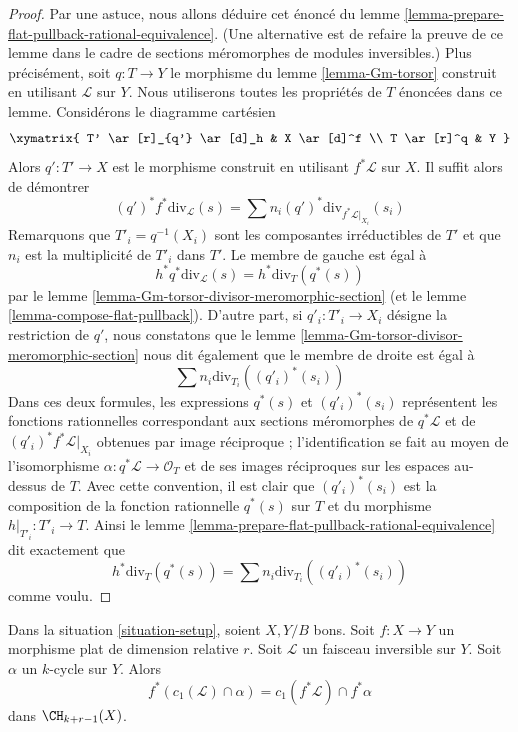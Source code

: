 \begin{proof}
Par une astuce, nous allons déduire cet énoncé du lemme
\ref{lemma-prepare-flat-pullback-rational-equivalence}. (Une alternative est
de refaire la preuve de ce lemme dans le cadre de sections méromorphes de
modules inversibles.) Plus précisément, soit $q : T \to Y$ le morphisme du lemme
\ref{lemma-Gm-torsor} construit en utilisant $\mathcal{L}$ sur $Y$. Nous
utiliserons toutes les propriétés de $T$ énoncées dans ce lemme. Considérons le
diagramme cartésien
$$
\xymatrix{
T' \ar[r]_{q'} \ar[d]_h & X \ar[d]^f \\
T \ar[r]^q & Y
}
$$
Alors $q' : T' \to X$ est le morphisme construit en utilisant $f^*\mathcal{L}$
sur $X$. Il suffit alors de démontrer
$$
(q')^*f^*\text{div}_\mathcal{L}(s) =
\sum n_i (q')^*\text{div}_{f^*\mathcal{L}|_{X_i}}(s_i)
$$
Remarquons que $T'_i = q^{-1}(X_i)$ sont les composantes irréductibles de $T'$
et que $n_i$ est la multiplicité de $T'_i$ dans $T'$. Le membre de gauche est
égal à
$$
h^*q^*\text{div}_\mathcal{L}(s) = h^*\text{div}_T(q^*(s))
$$
par le lemme \ref{lemma-Gm-torsor-divisor-meromorphic-section} (et le lemme
\ref{lemma-compose-flat-pullback}). D'autre part, si $q'_i : T'_i \to
X_i$ désigne la restriction de $q'$, nous constatons que le lemme
\ref{lemma-Gm-torsor-divisor-meromorphic-section} nous dit également que le
membre de droite est égal à
$$
\sum n_i \text{div}_{T_i}((q'_i)^*(s_i))
$$
Dans ces deux formules, les expressions $q^*(s)$ et $(q'_i)^*(s_i)$
représentent les fonctions rationnelles correspondant aux sections méromorphes
de $q^*\mathcal{L}$ et de $(q'_i)^*f^*\mathcal{L}|_{X_i}$ obtenues par image
réciproque ; l'identification se fait au moyen de l'isomorphisme
$\alpha : q^*\mathcal{L} \to \mathcal{O}_T$ et de ses images réciproques sur les
espaces au-dessus de $T$. Avec cette convention, il est clair que
$(q'_i)^*(s_i)$ est la composition de la fonction rationnelle $q^*(s)$ sur $T$
et du morphisme $h|_{T'_i} : T'_i \to T$. Ainsi le lemme
\ref{lemma-prepare-flat-pullback-rational-equivalence} dit exactement que
$$
h^*\text{div}_T(q^*(s)) = \sum n_i \text{div}_{T_i}((q'_i)^*(s_i))
$$
comme voulu.
\end{proof}

\begin{lemma}
\label{lemma-flat-pullback-cap-c1}
Dans la situation \ref{situation-setup}, soient $X, Y/B$ bons. Soit $f :
X \to Y$ un morphisme plat de dimension relative $r$. Soit $\mathcal{L}$ un
faisceau inversible sur $Y$. Soit $\alpha$ un $k$-cycle sur $Y$. Alors
$$
f^*(c_1(\mathcal{L}) \cap \alpha) = c_1(f^*\mathcal{L}) \cap f^*\alpha
$$
dans $\CH_{k + r - 1}(X)$.
\end{lemma}

